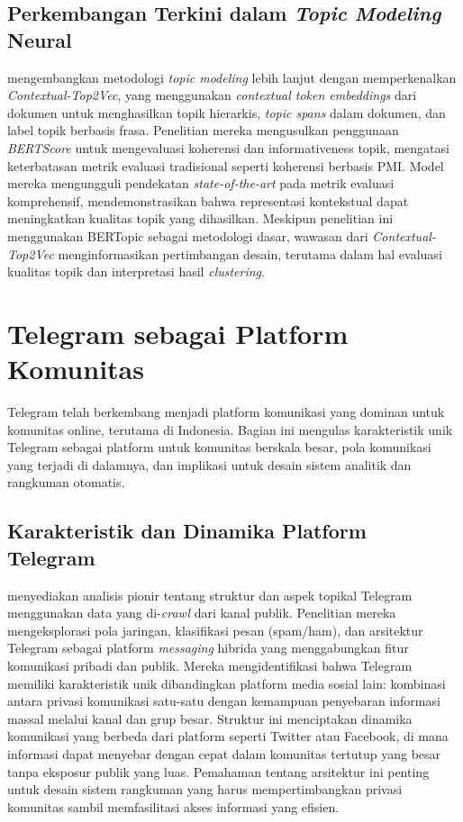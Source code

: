 \subsection{Perkembangan Terkini dalam \textit{Topic Modeling} Neural}

\textcite{angelov2024} mengembangkan metodologi \textit{topic modeling} lebih lanjut dengan memperkenalkan \textit{Contextual-Top2Vec}, yang menggunakan \textit{contextual token embeddings} dari dokumen untuk menghasilkan topik hierarkis, \textit{topic spans} dalam dokumen, dan label topik berbasis frasa. Penelitian mereka mengusulkan penggunaan \textit{BERTScore} untuk mengevaluasi koherensi dan informativeness topik, mengatasi keterbatasan metrik evaluasi tradisional seperti koherensi berbasis PMI. Model mereka mengungguli pendekatan \textit{state-of-the-art} pada metrik evaluasi komprehensif, mendemonstrasikan bahwa representasi kontekstual dapat meningkatkan kualitas topik yang dihasilkan. Meskipun penelitian ini menggunakan BERTopic sebagai metodologi dasar, wawasan dari \textit{Contextual-Top2Vec} menginformasikan pertimbangan desain, terutama dalam hal evaluasi kualitas topik dan interpretasi hasil \textit{clustering}.

\section{Telegram sebagai Platform Komunitas}
\label{sec:telegram-platform}

Telegram telah berkembang menjadi platform komunikasi yang dominan untuk komunitas online, terutama di Indonesia. Bagian ini mengulas karakteristik unik Telegram sebagai platform untuk komunitas berskala besar, pola komunikasi yang terjadi di dalamnya, dan implikasi untuk desain sistem analitik dan rangkuman otomatis.

\subsection{Karakteristik dan Dinamika Platform Telegram}

\textcite{nobari2017} menyediakan analisis pionir tentang struktur dan aspek topikal Telegram menggunakan data yang di-\textit{crawl} dari kanal publik. Penelitian mereka mengeksplorasi pola jaringan, klasifikasi pesan (spam/ham), dan arsitektur Telegram sebagai platform \textit{messaging} hibrida yang menggabungkan fitur komunikasi pribadi dan publik. Mereka mengidentifikasi bahwa Telegram memiliki karakteristik unik dibandingkan platform media sosial lain: kombinasi antara privasi komunikasi satu-satu dengan kemampuan penyebaran informasi massal melalui kanal dan grup besar. Struktur ini menciptakan dinamika komunikasi yang berbeda dari platform seperti Twitter atau Facebook, di mana informasi dapat menyebar dengan cepat dalam komunitas tertutup yang besar tanpa eksposur publik yang luas. Pemahaman tentang arsitektur ini penting untuk desain sistem rangkuman yang harus mempertimbangkan privasi komunitas sambil memfasilitasi akses informasi yang efisien.

